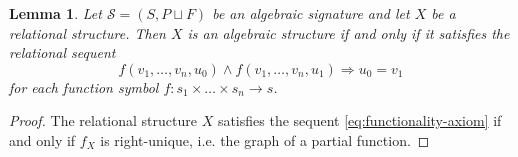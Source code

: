 \documentclass[a4paper]{article}
\newtheorem{lemma}[theorem]{Lemma}
\theoremstyle{remark}
\theoremstyle{definition}
\begin{document}
\begin{lemma}
  \label{lem:functionality-axioms}
  Let $\mathcal{S} = (S, P \sqcup F)$ be an algebraic signature and let $X$ be a relational structure.
  Then $X$ is an algebraic structure if and only if it satisfies the relational sequent
  \begin{equation}
    \label{eq:functionality-axiom}
    f(v_1, \dots, v_n, u_0) \land f(v_1, \dots, v_n, u_1) \Rightarrow u_0 = v_1
  \end{equation}
  for each function symbol $f : s_1 \times \dots \times s_n \rightarrow s$.
\end{lemma}
\begin{proof}
  The relational structure $X$ satisfies the sequent \eqref{eq:functionality-axiom} if and only if $f_X$ is right-unique, i.e. the graph of a partial function.
\end{proof}
\end{document}
